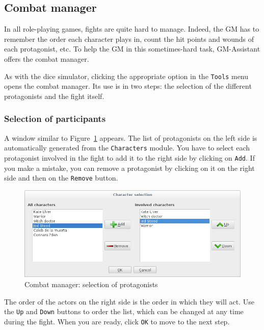 \documentclass[a4paper,12pt]{article}
\newcommand*{\GMA}{GM-Assistant\xspace}
\newcommand*{\interfaceitem}[1]{\texttt{#1}}
\begin{document}
\subsection{Combat manager}
\label{sec:combat}

In all role-playing games, fights are quite hard to manage. Indeed, the GM has to remember the order each character plays in, count the hit points and wounds of each protagonist, etc. To help the GM in this sometimes-hard task, \GMA offers the combat manager.

As with the dice simulator, clicking the appropriate option in the \interfaceitem{Tools} menu opens the combat manager. Its use is in two steps: the selection of the different protagonists and the fight itself.

\subsubsection{Selection of participants}
A window similar to Figure~\ref{gestion_combat_choix} appears. The list of protagonists on the left side is automatically generated from the \interfaceitem{Characters} module. You have to select each protagonist involved in the fight to add it to the right side by clicking on \interfaceitem{Add}. If you make a mistake, you can remove a protagonist by clicking on it on the right side and then on the \interfaceitem{Remove} button.
\begin{figure}[ht]
    \centerline{\includegraphics[width=1\textwidth]{combat_preparation}}
    \caption{Combat manager: selection of protagonists}
    \label{gestion_combat_choix}
\end{figure}

The order of the actors on the right side is the order in which they will act. Use the \interfaceitem{Up} and \interfaceitem{Down} buttons to order the list, which can be changed at any time during the fight. When you are ready, click \interfaceitem{OK} to move to the next step.
\end{document}

